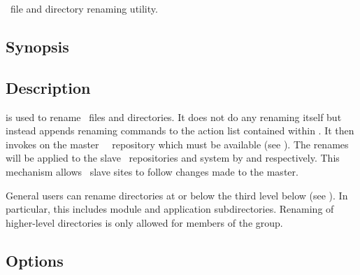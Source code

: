 \aipspp\ file and directory renaming utility.

\subsection*{Synopsis}

\begin{synopsis}
\end{synopsis}

\subsection*{Description}

 is used to rename \aipspp\ files and directories.  It does not do
any renaming itself but instead appends renaming commands to the action list
contained within .  It then invokes
 on the master \aipspp\ \rcs\ repository which must
be available (see ).  The renames will be applied to the
slave \rcs\ repositories and system by  and 
respectively.  This mechanism allows \aipspp\ slave sites to follow changes
made to the master.

General users can rename directories at or below the third level below
 (see ).  In particular, this includes
module and application subdirectories.  Renaming of higher-level directories
is only allowed for members of the  group.  

\subsection*{Options}

